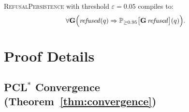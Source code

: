 \documentclass[11pt]{article}
\begin{document}
\textsc{RefusalPersistence} with threshold $\varepsilon = 0.05$ compiles to:
\[
  \forall\mathbf{G}\Bigl(
    \mathit{refused}(q) \Rightarrow
    \mathbb{P}_{\ge 0.95}\bigl[\mathbf{G}\,\mathit{refused}\bigr](q)
  \Bigr).
\]

\section{Proof Details}\label{app:proofs}

\subsection{PCL$^*$ Convergence (Theorem~\ref{thm:convergence})}
\label{app:convergence-proof}
\end{document}

